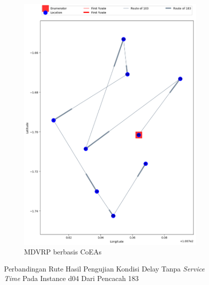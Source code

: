 \begin{figure}[H]
	\centering
	\begin{subfigure}[t]{\textwidth}
		\centering
		\includegraphics[width=\textwidth]{Resources/Images/delayed_4/real_m15_n100_delayed_4_183_coes}
		\caption{MDVRP berbasis CoEAs}
		\label{fig:real_m15_n100_delayed_4_183_coes}
	\end{subfigure}
	\caption{Perbandingan Rute Hasil Pengujian Kondisi Delay Tanpa \textit{Service Time} Pada Instance d04 Dari Pencacah 183}
	\label{fig:real_m15_n100_delayed_4_183}
\end{figure}


